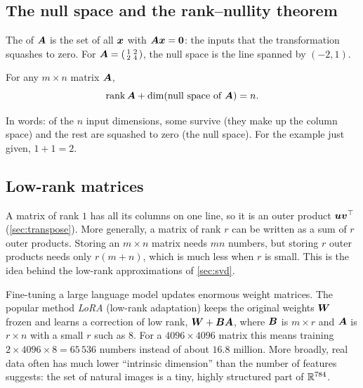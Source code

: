 \subsection{The null space and the rank--nullity theorem}

The  of $\bm{A}$ is the set of all $\bm{x}$ with $\bm{A}\bm{x} = \bm{0}$:
the inputs that the transformation squashes to zero. For
$\bm{A} = \left(\begin{smallmatrix} 1 & 2\\ 2 & 4\end{smallmatrix}\right)$, the
null space is the line spanned by $(-2, 1)$.

\begin{theorem}\label{thm:rank-nullity}
For any $m\times n$ matrix $\bm{A}$,
\[
  \operatorname{rank}\bm{A} + \dim(\text{null space of } \bm{A}) = n .
\]
\end{theorem}

In words: of the $n$ input dimensions, some survive (they make up the column
space) and the rest are squashed to zero (the null space). For the example
just given, $1 + 1 = 2$.

\subsection{Low-rank matrices}

A matrix of rank $1$ has all its columns on one line, so it is an outer
product $\bm{u}\bm{v}^\top$ (\cref{sec:transpose}). More generally, a matrix of rank $r$
can be written as a sum of $r$ outer products. Storing an $m\times n$ matrix
needs $mn$ numbers, but storing $r$ outer products needs only $r(m + n)$, which
is much less when $r$ is small. This is the idea behind the low-rank
approximations of \cref{sec:svd}.

\begin{mlnote}
Fine-tuning a large language model updates enormous weight matrices. The
popular method \emph{LoRA} (low-rank adaptation) keeps the original weights
$\bm{W}$ frozen and learns a correction of low rank,
$\bm{W} + \bm{B}\bm{A}$, where $\bm{B}$ is $m\times r$ and $\bm{A}$ is $r\times n$ with a
small $r$ such as $8$. For a $4096\times4096$ matrix this means training
$2 \times 4096 \times 8 = 65\,536$ numbers instead of about $16.8$ million.
More broadly, real data often has much lower ``intrinsic dimension'' than the
number of features suggests: the set of natural images is a tiny, highly
structured part of $\mathbb{R}^{784}$.
\end{mlnote}

